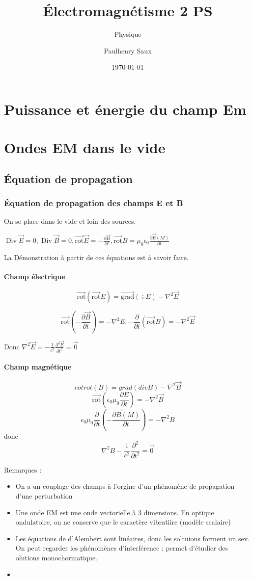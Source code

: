 \documentclass[french]{yLectureNote}
\title{Électromagnétisme 2 PS}
\subtitle{Physique}
\author{Paulhenry Saux}
\date{\today}
\renewcommand{\vec}{\overrightarrow}
\newcommand{\lap}{\nabla^2}
\newcommand{\E}{\vec{E}(M)}
\newcommand{\B}{\vec{B}(M)}
\DeclareMathOperator{\Div}{Div}
\newcommand{\rot}{\vec{\mathrm{rot}}}
\newcommand{\grad}{\vec{\mathrm{grad}}}
\begin{document}
\chapter{Puissance et énergie du champ Em}
\setcounter{chapter}{4}
\chapter{Ondes EM dans le vide}
\section{Équation de propagation}
\subsection{Équation de propagation des champs E et B}
On se place dans le vide et loin des sources.

$\Div \vec{E} = 0, \Div \vec{B} = 0, \rot \vec{E} = -\frac{\partial \vec{B}}{\partial t},\rot B = \mu_0 \epsilon_0 \frac{\partial \E}{\partial t}$

La Démonstration à partir de ces équations est à savoir faire.

\subsubsection{Champ électrique}
$$\rot(\rot E) = \grad(\div E)-\lap \vec{E}$$

$$\rot(-\frac{\partial \vec{B}}{\partial t}) = -\lap E, -\frac{\partial}{\partial t}(\rot B) = -\lap \vec{E}$$

Donc $ \lap \vec{E} = -\frac{1}{c^2}\frac{\partial^2 \vec{E}}{\partial t^2} = \vec{0}$

\subsubsection{Champ magnétique}
$$rot rot(B) = grad (div B) -\lap \vec{B}$$
$$\rot(\epsilon_0\mu_0 \frac{\partial E}{\partial t}) = -\lap \vec{B}$$
$$\epsilon_0\mu_0 \frac{\partial}{\partial t}(-\frac{\partial \B}{\partial t}) = -\lap B$$
donc $$\lap B - \frac{1}{c^2} \frac{\partial^2}{\partial t^2} = \vec{0}$$

Remarques :
\begin{itemize}
    \item On a un couplage des champs à l'orgine d'un phénomène de propagation d'une perturbation
    \item Une onde EM est une onde vectorielle à  3 dimensions. En optique ondulatoire, on ne conserve que le caractère vibratiire (modèle scalaire)
    \item Les équations de d'Alembert sont linéaires, donc les soltuions forment un sev. On peut regarder les phénomènes d'interférence : permet d'étudier des olutions monochormatique.
    \item 
\end{itemize}
\end{document}
